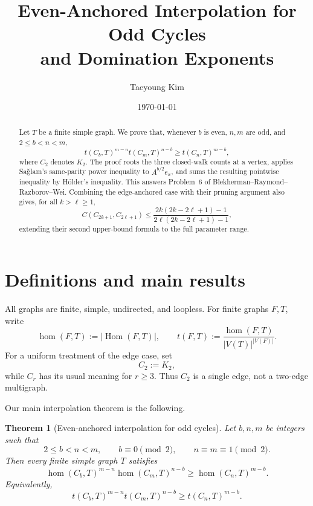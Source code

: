 \documentclass[11pt]{article}
\title{Even-Anchored Interpolation for Odd Cycles\\
and Domination Exponents}
\author{Taeyoung Kim}
\date{\today}
\newtheorem{theorem}{Theorem}[section]
\theoremstyle{definition}
\theoremstyle{remark}
\newcommand{\Hom}{\operatorname{Hom}}
\newcommand{\homn}{\operatorname{hom}}
\begin{document}
\maketitle

\begin{abstract}
Let $T$ be a finite simple graph.  We prove that, whenever $b$ is even,
$n,m$ are odd, and $2\le b<n<m$,
\[
  t(C_b,T)^{m-n}t(C_m,T)^{n-b}
  \ge t(C_n,T)^{m-b},
\]
where $C_2$ denotes $K_2$.  The proof roots the
three closed-walk counts at a vertex, applies Sa\u{g}lam's same-parity
power inequality to $A^{b/2}e_x$, and sums the resulting pointwise
inequality by H\"older's inequality.  This answers Problem~6 of
Blekherman--Raymond--Razborov--Wei.  Combining the edge-anchored case
with their pruning argument also gives, for all $k>\ell\ge1$,
\[
  C(C_{2k+1},C_{2\ell+1})
  \le
  \frac{2k(2k-2\ell+1)-1}
       {2\ell(2k-2\ell+1)-1},
\]
extending their second upper-bound formula to the full parameter range.
\end{abstract}

\section{Definitions and main results}

All graphs are finite, simple, undirected, and loopless.  For finite
graphs $F,T$, write
\[
  \homn(F,T):=|\Hom(F,T)|,
  \qquad
  t(F,T):=\frac{\homn(F,T)}{|V(T)|^{|V(F)|}}.
\]
For a uniform treatment of the edge case, set
\[
  C_2:=K_2,
\]
while $C_r$ has its usual meaning for $r\ge3$.  Thus $C_2$ is a single
edge, not a two-edge multigraph.

Our main interpolation theorem is the following.

\begin{theorem}[Even-anchored interpolation for odd cycles]
  \label{thm:interpolation}
  Let $b,n,m$ be integers such that
  \[
    2\le b<n<m,
    \qquad
    b\equiv0\pmod2,
    \qquad
    n\equiv m\equiv1\pmod2.
  \]
  Then every finite simple graph $T$ satisfies
  \begin{equation}
    \homn(C_b,T)^{m-n}\homn(C_m,T)^{n-b}
    \ge
    \homn(C_n,T)^{m-b}.
    \label{eq:main-hom}
  \end{equation}
  Equivalently,
  \begin{equation}
    t(C_b,T)^{m-n}t(C_m,T)^{n-b}
    \ge
    t(C_n,T)^{m-b}.
    \label{eq:main-density}
  \end{equation}
\end{theorem}
\end{document}
